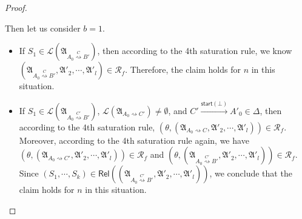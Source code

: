 \documentclass[preprint,12pt]{elsarticle}
\newcommand\Pp{{\mathcal{P} }}
\newcommand\startactivity{{\mathsf{start} }}
\newcommand\post{{\mathsf{post} }}
\newcommand\AutReach{\mathscr{R}}
\newcommand\Rel{\mathsf{Rel}}
\newcommand\Aut{{\mathfrak{A} }}
\newcommand\Lang{{\mathscr{L} }}
\newcommand{\zhilin}[1]{\color{blue} {ZL: #1 :LZ} \color{black}}
\newcommand{\zhilin}[1]{}
\begin{document}
\begin{proof}
{\begin{itemize}
  Then let us consider $b = 1$. 
  \begin{itemize}
  \item If $S_1 \in \Lang(\Aut_{A_0\stackrel{C}{\rightsquigarrow} B'})$, then according to the 4th saturation rule, we know $(\Aut_{A_0\stackrel{C}{\rightsquigarrow} B'}, \Aut'_2, \cdots, \Aut'_l) \in \AutReach_f$. Therefore, the claim holds for $n$ in this situation.   
   \item If $S_1 \in \Lang(\Aut_{A_0\stackrel{C'}{\rightsquigarrow} B'})$, $\Lang(\Aut_{A_0\rightsquigarrow C'}) \neq \emptyset$, and $C' \xrightarrow[]{\startactivity(\bot)} A'_0 \in \Delta$, then 
   according to the 4th saturation rule, $(\theta, (\Aut_{A_0\rightsquigarrow C}, \Aut'_2, \cdots, \Aut'_l)) \in \AutReach_f$. Moreover, according to the 4th saturation rule again, we have $(\theta, (\Aut_{A_0\rightsquigarrow C'}, \Aut'_2, \cdots, \Aut'_l)) \in \AutReach_f$ and $(\theta, (\Aut_{A_0\stackrel{C'}{\rightsquigarrow} B'}, \Aut'_2, \cdots, \Aut'_l)) \in \AutReach_f$. 
   Since $(S_1, \cdots, S_k) \in \Rel((\Aut_{A_0\stackrel{C'}{\rightsquigarrow} B'}, \Aut'_2, \cdots, \Aut'_l))$,  we conclude that the claim holds for $n$ in this situation. 
   \end{itemize}
    \end{itemize}
   
    
}
\end{proof}
\end{document}
